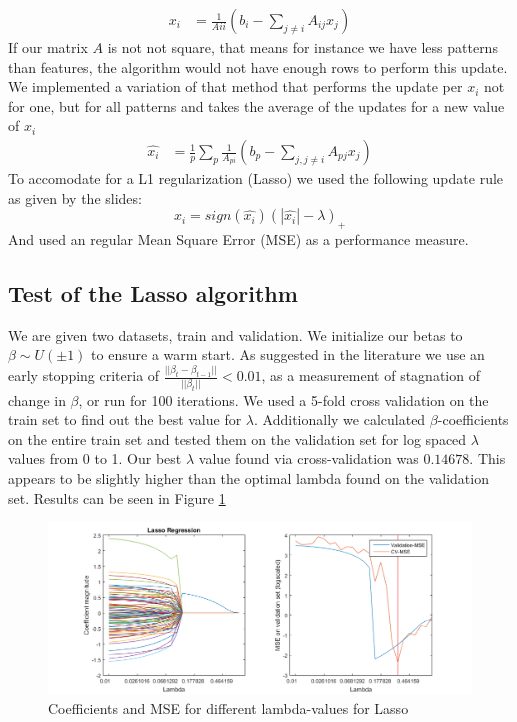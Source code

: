 \documentclass[a4paper, 11pt]{article}
\begin{document}
\begin{equation}
\begin{split}
x_i & = \frac{1}{A{ii}}(b_i-\sum_{j\neq i}A_{ij}x_j)
\end{split}
\end{equation}
If our matrix $A$ is not not square, that means for instance we have less patterns than features, the algorithm would not have enough rows to perform this update.\\
We implemented a variation of that method that performs the update per $x_i$ not for one, but for all patterns and takes the average of the updates for a new value of $x_i$\\

\begin{equation}
\begin{split}
\hat{x_i} & = \frac{1}{p} \sum_p \frac{1}{A_{pi}}(b_p-\sum_{j,j\neq i}A_{pj}x_j)
\end{split}
\end{equation}
To accomodate for a L1 regularization (Lasso) we used the following update rule as given by the slides:
\begin{equation}
x_i = sign(\hat{x_i})(|\hat{x_i}|-\lambda)_+
\end{equation}
And used an regular Mean Square Error (MSE) as a performance measure.

\subsection*{Test of the Lasso algorithm}
We are given two datasets, train and validation. We initialize our betas to $\beta\sim U(\pm 1)$ to ensure a warm start. As suggested in the literature we use an early stopping criteria of $\frac{||\beta_t - \beta_{t-1}||}{||\beta_t||}<0.01$, as a measurement of stagnation of change in $\beta$, or run for 100 iterations.
We used a 5-fold cross validation on the train set to find out the best value for $\lambda$. Additionally we calculated $\beta$-coefficients on the entire train set and tested them on the validation set for log spaced $\lambda$ values from 0 to 1.
Our best $\lambda$ value found via cross-validation was $0.14678$. This appears to be slightly higher than the optimal lambda found on the validation set. Results can be seen in Figure \ref{img:lambda}


\begin{figure}[htbp]
\hspace{-3.5cm}
\includegraphics[scale=0.8]{lasso.png}
\caption{Coefficients and MSE for different lambda-values for Lasso}
\label{img:lambda}
\end{figure}
\end{document}
